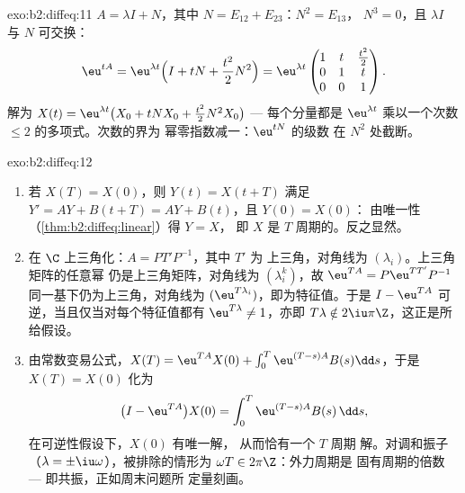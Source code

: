 \begin{solution}{exo:b2:diffeq:11}
$A = \lambda I + N$，其中 $N = E_{12} + E_{23}$：$N^2 = E_{13}$，
$N^3 = 0$，且 $\lambda I$ 与 $N$ 可交换：
\[
\eu^{tA} = \eu^{\lambda t}\Bigl(I + tN +
\frac{t^2}{2}N^2\Bigr)
= \eu^{\lambda t}\begin{pmatrix}
1 & t & \frac{t^2}{2}\\
0 & 1 & t\\
0 & 0 & 1
\end{pmatrix}.
\]
解为 $X(t) = \eu^{\lambda t}\bigl(X_0 + tNX_0 +
\frac{t^2}2N^2X_0\bigr)$ --- 每个分量都是 $\eu^{\lambda
t}$ 乘以一个次数 $\leq 2$ 的多项式。次数的界为
幂零指数减一：$\eu^{tN}$ 的级数
在 $N^2$ 处截断。
\end{solution}

\begin{solution}{exo:b2:diffeq:12}
\begin{enumerate}
  \item 若 $X(T) = X(0)$，则 $Y(t) = X(t + T)$ 满足 $Y' =
        AY + B(t + T) = AY + B(t)$，且 $Y(0) = X(0)$：
        由唯一性（\cref{thm:b2:diffeq:linear}）得 $Y = X$，
        即 $X$ 是 $T$ 周期的。反之显然。
  \item 在 $\C$ 上三角化：$A = PT'P^{-1}$，其中 $T'$ 为
        上三角，对角线为 $(\lambda_i)$。上三角矩阵的任意幂
        仍是上三角矩阵，对角线为
        $(\lambda_i^k)$，故 $\eu^{TA} = P\eu^{TT'}P^{-1}$
        同一基下仍为上三角，对角线为
        $(\eu^{T\lambda_i})$，即为特征值。于是
        $I - \eu^{TA}$ 可逆，当且仅当对每个特征值都有 $\eu^{T\lambda} \neq
        1$，亦即 $T\lambda \notin
        2\iu\pi\Z$，这正是所给假设。
  \item 由常数变易公式，$X(T) = \eu^{TA}X(0) +
        \int_0^T\eu^{(T-s)A}B(s)\dd s$，于是 $X(T) = X(0)$ 化为
        \[
        \bigl(I - \eu^{TA}\bigr)X(0) =
        \int_0^{T}\eu^{(T-s)A}B(s)\,\dd s ,
        \]
        在可逆性假设下，$X(0)$ 有唯一解，
        从而恰有一个 $T$ 周期
        解。对调和振子（$\lambda =
        \pm\iu\omega$），被排除的情形为 $\omega T \in
        2\pi\Z$：外力周期是
        固有周期的倍数 --- 即共振，正如周末问题所
        定量刻画。
\end{enumerate}
\end{solution}

